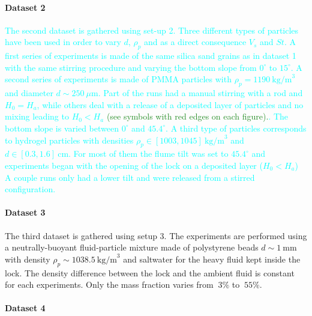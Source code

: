 \documentclass[twocolumn]{article}
\newcommand*{\cyril}{\textcolor{ForestGreen}}
\newcommand*{\marie}{\textcolor{Cyan}}
\newcommand*{\jean}{\textcolor{jeanc}}
\begin{document}
\paragraph{Dataset 2}
\marie{The second dataset is gathered using set-up 2. Three different types of particles have been used in order to vary $d$, $\rho_p$ and as a direct consequence $V_s$ and $St$. A first series of experiments is made of the same silica sand grains as in dataset 1 with the same stirring procedure and varying the bottom slope from $0^\circ$ to $15^\circ$. A second series of experiments is made of PMMA particles with $\rho_p=1190~\textrm{kg/m}^{3}$ and diameter $d\sim 250~\mu\textrm{m}$. Part of the runs had a manual stirring with a rod and $H_0=H_a$, while others deal with a release of a deposited layer of particles and no mixing leading to $H_0<H_a$ \cyril{(see symbols with red edges on each figure).}. The bottom slope is varied between $0^\circ$ and $45.4^\circ$. A third type of particles corresponds to hydrogel particles with densities $\rho_p\in [1003, 1045]~\textrm{kg/m}^{3}$ and $d\in [0.3, 1.6]~\textrm{cm}$. For most of them the flume tilt was set to $45.4^\circ$ and experiments began with the opening of the lock on a deposited layer ($H_0<H_a$) A couple runs only had a lower tilt and were released from a stirred configuration.}

\paragraph{Dataset 3}

\jean{The third dataset is gathered using setup 3. The experiments are performed using a neutrally-buoyant fluid-particle mixture made of polystyrene beads $d \sim 1~\textrm{mm}$ with density $\rho_p \sim 1038.5~\textrm{kg/m}^{3}$ and saltwater for the heavy fluid kept inside the lock.  The density difference between the lock and the ambient fluid is constant for each experiments. Only the mass fraction varies from $~3 \%$ to $~55 \%$.}

\paragraph{Dataset 4}
\end{document}
